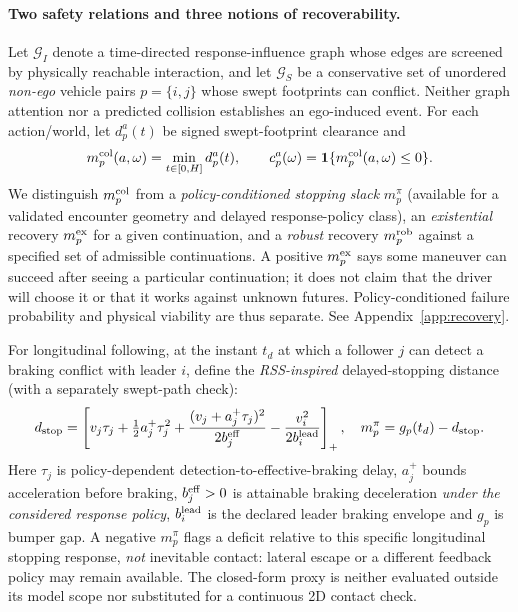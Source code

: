 \documentclass[10pt]{article}
\newcommand{\ind}{\mathbf{1}}
\newcommand{\cG}{\mathcal{G}}\newcommand{\cK}{\mathcal{K}}
\newcommand{\relu}[1]{\left[#1\right]_+}
\begin{document}
\paragraph{Two safety relations and three notions of recoverability.}
Let $\cG_I$ denote a time-directed response-influence graph whose edges are screened by physically reachable interaction, and let $\cG_S$ be a conservative set of unordered \emph{non-ego} vehicle pairs $p=\{i,j\}$ whose swept footprints can conflict. Neither graph attention nor a predicted collision establishes an ego-induced event. For each action/world, let $d_p^a(t)$ be signed swept-footprint clearance and
\begin{equation}
 m_p^{\rm col}(a,\omega)=\min_{t\in[0,H]}d_p^a(t),\qquad
 c_p^a(\omega)=\ind\{m_p^{\rm col}(a,\omega)\leq0\}.
 \label{eq:col}
\end{equation}
We distinguish $m_p^{\rm col}$ from a \emph{policy-conditioned stopping slack} $m_p^{\pi}$ (available for a validated encounter geometry and delayed response-policy class), an \emph{existential} recovery $m_p^{\rm ex}$ for a given continuation, and a \emph{robust} recovery $m_p^{\rm rob}$ against a specified set of admissible continuations. A positive $m_p^{\rm ex}$ says some maneuver can succeed after seeing a particular continuation; it does not claim that the driver will choose it or that it works against unknown futures. Policy-conditioned failure probability and physical viability are thus separate. See Appendix~\ref{app:recovery}.

For longitudinal following, at the instant $t_d$ at which a follower $j$ can detect a braking conflict with leader $i$, define the \emph{RSS-inspired} delayed-stopping distance (with a separately swept-path check):
\begin{equation}
 d_{\rm stop}=\relu{
  v_j\tau_j+\tfrac12a_j^+\tau_j^2+
  \frac{(v_j+a_j^+\tau_j)^2}{2b_j^{\rm eff}}-
  \frac{v_i^2}{2b_i^{\rm lead}}},\quad
 m_p^{\pi}=g_p(t_d)-d_{\rm stop}.
 \label{eq:stop}
\end{equation}
Here $\tau_j$ is policy-dependent detection-to-effective-braking delay, $a_j^+$ bounds acceleration before braking, $b_j^{\rm eff}>0$ is attainable braking deceleration \emph{under the considered response policy}, $b_i^{\rm lead}$ is the declared leader braking envelope and $g_p$ is bumper gap. A negative $m_p^\pi$ flags a deficit relative to this specific longitudinal stopping response, \emph{not} inevitable contact: lateral escape or a different feedback policy may remain available. The closed-form proxy is neither evaluated outside its model scope nor substituted for a continuous 2D contact check. \parencite{shalev2017rss,durrani2024new}
\end{document}
